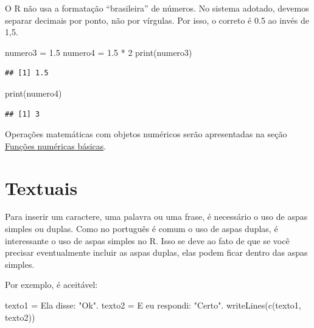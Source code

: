 \documentclass[
]{book}
\newenvironment{Shaded}{\begin{snugshade}}{\end{snugshade}}
\newcommand{\DecValTok}[1]{\textcolor[rgb]{0.00,0.00,0.81}{#1}}
\newcommand{\FloatTok}[1]{\textcolor[rgb]{0.00,0.00,0.81}{#1}}
\newcommand{\FunctionTok}[1]{\textcolor[rgb]{0.00,0.00,0.00}{#1}}
\newcommand{\NormalTok}[1]{#1}
\newcommand{\OtherTok}[1]{\textcolor[rgb]{0.56,0.35,0.01}{#1}}
\newcommand{\SpecialCharTok}[1]{\textcolor[rgb]{0.00,0.00,0.00}{#1}}
\newcommand{\StringTok}[1]{\textcolor[rgb]{0.31,0.60,0.02}{#1}}
\begin{document}
O R não usa a formatação ``brasileira'' de números. No sistema adotado, devemos separar decimais por ponto, não por vírgulas. Por isso, o correto é 0.5 ao invés de 1,5.

\begin{Shaded}
\begin{Highlighting}[]
\NormalTok{numero3 }\OtherTok{=} \FloatTok{1.5}
\NormalTok{numero4 }\OtherTok{=} \FloatTok{1.5} \SpecialCharTok{*} \DecValTok{2}
\FunctionTok{print}\NormalTok{(numero3)}
\end{Highlighting}
\end{Shaded}

\begin{verbatim}
## [1] 1.5
\end{verbatim}

\begin{Shaded}
\begin{Highlighting}[]
\FunctionTok{print}\NormalTok{(numero4)}
\end{Highlighting}
\end{Shaded}

\begin{verbatim}
## [1] 3
\end{verbatim}

Operações matemáticas com objetos numéricos serão apresentadas na seção \protect\hyperlink{funuxe7uxf5es-numuxe9ricas-buxe1sicas}{Funções numéricas básicas}.

\hypertarget{textuais}{%
\section{Textuais}\label{textuais}}

Para inserir um caractere, uma palavra ou uma frase, é necessário o uso de aspas simples ou duplas. Como no português é comum o uso de aspas duplas, é interessante o uso de aspas simples no R. Isso se deve ao fato de que se você precisar eventualmente incluir as aspas duplas, elas podem ficar dentro das aspas simples.

Por exemplo, é aceitável:

\begin{Shaded}
\begin{Highlighting}[]
\NormalTok{texto1 }\OtherTok{=} \StringTok{\textquotesingle{}Ela disse: "Ok".\textquotesingle{}}
\NormalTok{texto2 }\OtherTok{=} \StringTok{\textquotesingle{}E eu respondi: "Certo".\textquotesingle{}}
\FunctionTok{writeLines}\NormalTok{(}\FunctionTok{c}\NormalTok{(texto1, texto2))}
\end{Highlighting}
\end{Shaded}
\end{document}
